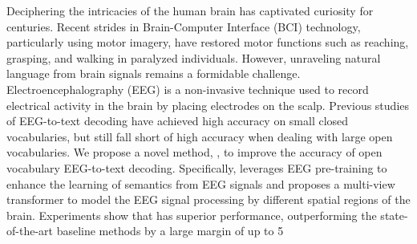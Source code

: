Deciphering the intricacies of the human brain has captivated curiosity for centuries. Recent strides in Brain-Computer Interface (BCI) technology, particularly using motor imagery, have restored motor functions such as reaching, grasping, and walking in paralyzed individuals. However, unraveling natural language from brain signals remains a formidable challenge. Electroencephalography (EEG) is a non-invasive technique used to record electrical activity in the brain by placing electrodes on the scalp. Previous studies of EEG-to-text decoding have achieved high accuracy on small closed vocabularies, but still fall short of high accuracy when dealing with large open vocabularies.  
We propose a novel method, \our, to improve the accuracy of open vocabulary EEG-to-text decoding. 
Specifically, \our leverages EEG pre-training to enhance the learning of semantics from EEG signals and proposes a multi-view transformer to model the EEG signal processing by different spatial regions of the brain. Experiments show that \our has superior performance, outperforming the state-of-the-art baseline methods by a large margin of up to 5\